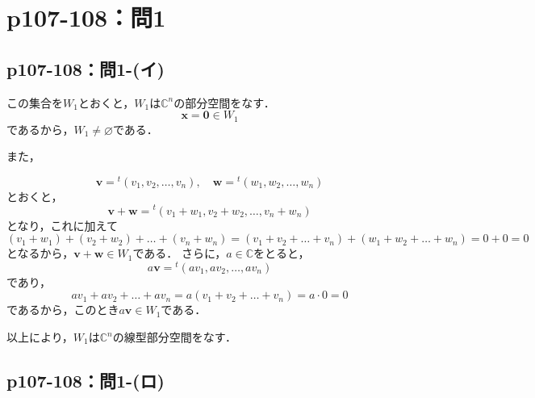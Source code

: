 \documentclass[a4paper,10pt,fleqn]{ltjsarticle}
\begin{document}
\newpage
\section*{p107-108：問1}


\subsection*{p107-108：問1-(イ)}


\begin{tleftbar}
    この集合を$W_1$とおくと，$W_1$は$\mathbb{C}^n$の部分空間をなす．
    \[
        \bm{x} =\bm{0} \in  W_1
    \]
    であるから，$W_1 \ne \varnothing$である．

    また，

    \[
        \bm{v} = {}^t ( v_{1} , v_{2} , \ldots ,v_{n} ) , \quad \bm{w} = {}^t (w_{1} , w_{2} , \ldots , w_{n} )
    \]
    とおくと，
    \[
        \bm{v}+\bm{w}={}^t (v_1+w_1,v_2+w_2,\ldots,v_n + w_n)
    \]
    となり，これに加えて
    \[
        ( v_1+w_1)+(v_2+w_2) + \dots + (v_n + w_n) =(v_1+v_2+\dots + v_n ) + (w_1+w_2+\dots + w_n )=0+0=0
    \]
    となるから，$\bm{v}+\bm{w} \in W_1$である．
    さらに，$a \in \mathbb{C}$をとると，
    \[
        a \bm{v}={}^t ( av_{1} ,av_{2} , \ldots , av_{n} )
    \]
    であり，
    \[
        av_1 + av_2+ \dots + av_n = a (v_1 + v_2 + \dots + v_n) = a \cdot 0 =0
    \]
    であるから，このとき$ a \bm{v} \in W_1$である．

    以上により，$W_1$は$\mathbb{C}^n$の線型部分空間をなす．
\end{tleftbar}


\subsection*{p107-108：問1-(ロ)}
\end{document}
